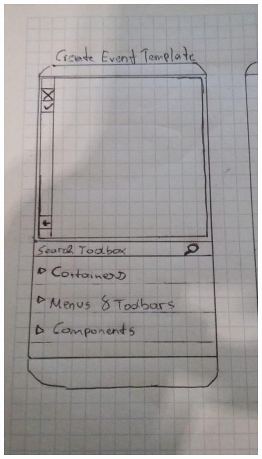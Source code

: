 \documentclass[12pt]{article}
\theoremstyle{definition}
\begin{document}
\includegraphics[scale=.2]{create_event.jpeg} \\
\end{document}
